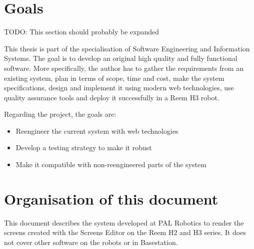



\section{Goals}
TODO: This section should probably be expanded

This thesis is part of the specialisation of Software Engineering and Information Systems. 
The goal is to develop an original high quality and fully functional software. 
More specifically, the author has to gather the requirements from an existing system, plan in terms of scope, time and cost, make the system specifications, design and implement it using modern web technologies, use quality assurance tools and deploy it successfully in a Reem H3 robot.

Regarding the project, the goals are:
\begin{itemize}
	\item Reengineer the current system with web technologies
	\item Develop a testing strategy to make it robust
	\item Make it compatible with non-reengineered parts of the system
\end{itemize}


\section{Organisation of this document}
This document describes the system developed at PAL Robotics to render the screens created with the Screens Editor on the Reem H2 and H3 series.
It does not cover other software on the robots or in Basestation.

